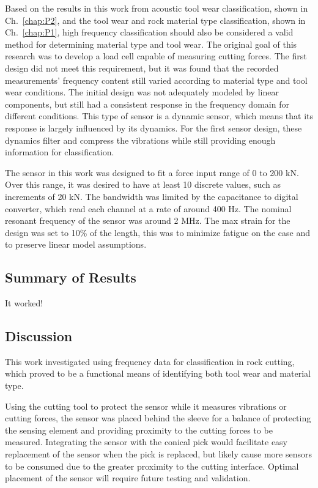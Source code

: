 Based on the results in this work from acoustic tool wear classification, shown in Ch.~\ref{chap:P2}, 
and the tool wear and rock material type classification, shown in Ch.~\ref{chap:P1}, high frequency classification 
should also be considered a valid method for determining material type and tool wear. 
The original goal of this research was to develop a load cell capable of measuring cutting forces.
The first design did not meet this requirement, but it was found that the recorded measurements'
frequency content still varied according to material type and tool wear conditions.
The initial design was not adequately modeled by linear components, but still 
had a consistent response in the frequency domain for different conditions.
This type of sensor is a dynamic sensor, which means that its response
is largely influenced by its dynamics. For the first sensor design,
these dynamics filter and compress the vibrations while still providing enough information for classification.

The sensor in this work was designed to fit a force input range of 0 to 200 kN.
Over this range, it was desired to have at least 10 discrete values, such as increments of 20 kN.
The bandwidth was limited by the capacitance to digital converter, 
which read each channel at a rate of around 400 Hz. The nominal resonant frequency of the sensor 
was around 2 MHz. The max strain for the design was set to 10\% of the length, this was to
minimize fatigue on the case and to preserve linear model assumptions.

\subsection{Summary of Results}

It worked!

\subsection{Discussion}

This work investigated using frequency data for classification in rock cutting,
which proved to be a functional means of identifying both tool wear and material type.

Using the cutting tool to protect the sensor while it measures vibrations or cutting forces,
the sensor was placed behind the sleeve for a balance of protecting the sensing element 
and providing proximity to the cutting forces to be measured.
Integrating the sensor with the conical pick would facilitate easy replacement of the sensor when the pick is replaced,
but likely cause more sensors to be consumed due to the greater proximity to the cutting interface.
Optimal placement of the sensor will require future testing and validation.

